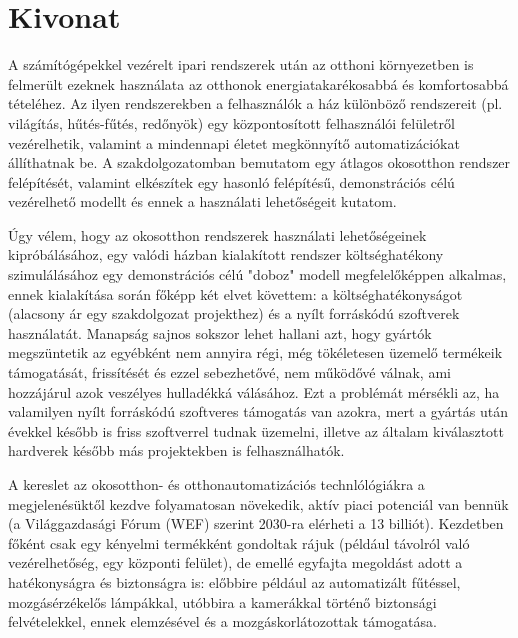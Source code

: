 \setcounter{page}{1}

\selecthungarian

\chapter*{Kivonat}

A számítógépekkel vezérelt ipari rendszerek után az otthoni környezetben is felmerült ezeknek használata az otthonok energiatakarékosabbá és komfortosabbá tételéhez. Az ilyen rendszerekben a felhasználók a ház különböző rendszereit (pl. világítás, hűtés-fűtés, redőnyök) egy központosított felhasználói felületről vezérelhetik, valamint a mindennapi életet megkönnyítő automatizációkat állíthatnak be. A szakdolgozatomban bemutatom egy átlagos okosotthon rendszer felépítését, valamint elkészítek egy hasonló felépítésű, demonstrációs célú vezérelhető modellt és ennek a használati lehetőségeit kutatom. 
\break

Úgy vélem, hogy az okosotthon rendszerek használati lehetőségeinek kipróbálásához, egy valódi házban kialakított rendszer költséghatékony szimulálásához egy demonstrációs célú "doboz" modell megfelelőképpen alkalmas, ennek kialakítása során főképp két elvet követtem: a költséghatékonyságot (alacsony ár egy szakdolgozat projekthez) és a nyílt forráskódú szoftverek használatát. Manapság sajnos sokszor lehet hallani azt, hogy gyártók megszüntetik az egyébként nem annyira régi, még tökéletesen üzemelő termékeik támogatását, frissítését és ezzel sebezhetővé, nem működővé válnak, ami hozzájárul azok veszélyes hulladékká válásához. Ezt a problémát mérsékli az, ha valamilyen nyílt forráskódú szoftveres támogatás van azokra, mert a gyártás után évekkel később is friss szoftverrel tudnak üzemelni, illetve az általam kiválasztott hardverek később más projektekben is felhasználhatók. %
\break

A kereslet az okosotthon- és otthonautomatizációs technlólógiákra a megjelenésüktől kezdve folyamatosan növekedik, aktív piaci potenciál van bennük (a Világgazdasági Fórum (WEF) szerint 2030-ra elérheti a 13 billiót). Kezdetben főként csak egy kényelmi termékként gondoltak rájuk (például távolról való vezérelhetőség, egy központi felület), de emellé egyfajta megoldást adott a hatékonyságra és biztonságra is: előbbire például az automatizált fűtéssel, mozgásérzékelős lámpákkal, utóbbira a kamerákkal történő biztonsági felvételekkel, ennek elemzésével és a mozgáskorlátozottak támogatása.  %
\break

